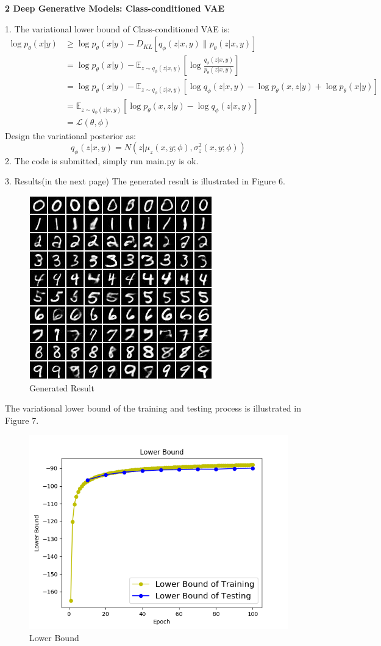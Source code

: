 \documentclass[12pt]{article}
\begin{document}
\bigskip \par
{\large \bf 2 Deep Generative Models: Class-conditioned VAE}
\bigskip \par
1. The variational lower bound of Class-conditioned VAE is:
\begin{align*}
\log p_\theta(x|y)&\geq\log p_\theta(x|y)-D_{KL}\left[q_\phi(z|x,y)\|p_\theta(z|x,y)\right]\\
&=\log p_\theta(x|y)-\mathbb{E}_{z\sim q_\phi(z|x,y)}\left[\log\frac{q_\phi(z|x,y)}{p_\theta(z|x,y)}\right]\\
&=\log p_\theta(x|y)-\mathbb{E}_{z\sim q_\phi(z|x,y)}\left[\log q_\phi(z|x,y)-\log p_\theta(x,z|y)+\log p_\theta(x|y) \right]\\
&=\mathbb{E}_{z\sim q_\phi(z|x,y)}\left[\log p_\theta(x,z|y)-\log q_\phi(z|x,y)\right]\\
&=\mathcal{L}(\theta,\phi)
\end{align*}
Design the variational posterior as:
$$q_\phi(z|x,y)=N(z|\mu_z(x,y;\phi),\sigma_z^2(x,y;\phi))$$
2. The code is submitted, simply run main.py is ok.
\par
3. Results(in the next page)
\newpage
The generated result is illustrated in Figure 6.
\begin{figure}[ht]
\centering
\includegraphics[scale=0.58]{epoch_3.jpg}
\caption{Generated Result}
\end{figure}
\par
The variational lower bound of the training and testing process is illustrated in Figure 7.
\begin{figure}[ht]
\centering
\includegraphics[scale=0.58]{Lower_Bound.png}
\caption{Lower Bound}
\end{figure}
\end{document}
